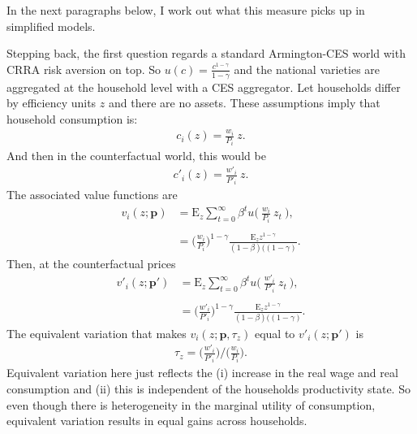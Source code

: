 \documentclass[12pt,pdftex]{article}
\begin{document}
\begin{onehalfspacing}
In the next paragraphs below, I work out what this measure picks up in simplified models.

Stepping back, the first question regards a standard Armington-CES world with CRRA risk aversion on top. So $u(c) = \frac{c^{1-\gamma}}{1-\gamma}$ and the national varieties are aggregated at the household level with a CES aggregator.  Let households differ by efficiency units $z$ and there are no assets. These assumptions imply that household consumption is:
\begin{align}
c_i(z) = \frac{w_{i}}{P_{i}} \ z.
\end{align}
And then in the counterfactual world, this would be
\begin{align}
c'_i(z) = \frac{w'_{i}}{P'_{i}} \ z.
\end{align}
The associated value functions are
\begin{align}
v_i(z ; \mathbf{p}) & = \mathrm{E}_{z} \sum_{t = 0}^{\infty} \beta^{t} u \bigg ( \ \frac{w_{i}}{P_{i}} \ z_{t} \ \bigg ), \\
\nonumber \\
& =\bigg( \frac{w_{i}}{P_{i}}  \bigg )^{1-\gamma} \frac{\mathrm{E}_{z} z^{1-\gamma}}{(1 - \beta)((1-\gamma)}.
\end{align}
Then, at the counterfactual prices
\begin{align}
v'_i(z ; \mathbf{p'}) & = \mathrm{E}_{z} \sum_{t = 0}^{\infty} \beta^{t} u \bigg ( \ \frac{w'_{i}}{P'_{i}} \ z_{t} \ \bigg ), \\
\nonumber \\
& =\bigg( \frac{w'_{i}}{P'_{i}}  \bigg )^{1-\gamma} \frac{\mathrm{E}_{z} z^{1-\gamma}}{(1 - \beta)((1-\gamma)}.
\end{align}
The equivalent variation that makes $v_i(z ; \mathbf{p}, \tau_z)$ equal to $v'_i(z ; \mathbf{p'})$ is
\begin{align}
\tau_z  = \bigg( \frac{w'_{i}}{P'_{i}} \bigg ) \bigg / \bigg( \frac{w_{i}}{P_{i}} \bigg).
\end{align}
Equivalent variation here just reflects the (i) increase in the real wage and real consumption and (ii) this is independent of the households productivity state. So even though there is heterogeneity in the marginal utility of consumption, equivalent variation results in equal gains across households.


\end{onehalfspacing}
\end{document}
